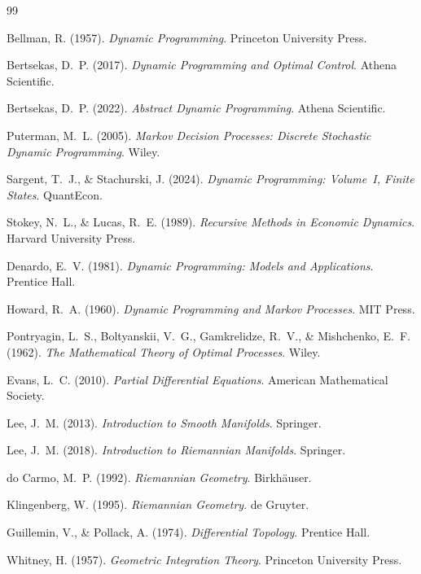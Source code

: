 \documentclass[12pt, a4paper, openany]{book}
\theoremstyle{plain}
\theoremstyle{definition}
\theoremstyle{remark}
\begin{document}
\begin{thebibliography}{99}

Bellman, R. (1957).
\textit{Dynamic Programming}.
Princeton University Press.

Bertsekas, D.~P. (2017).
\textit{Dynamic Programming and Optimal Control}.
Athena Scientific.

Bertsekas, D.~P. (2022).
\textit{Abstract Dynamic Programming}.
Athena Scientific.

Puterman, M.~L. (2005).
\textit{Markov Decision Processes: Discrete Stochastic Dynamic Programming}.
Wiley.

Sargent, T.~J., \& Stachurski, J. (2024).
\textit{Dynamic Programming: Volume~I, Finite States}.
QuantEcon.

Stokey, N.~L., \& Lucas, R.~E. (1989).
\textit{Recursive Methods in Economic Dynamics}.
Harvard University Press.

Denardo, E.~V. (1981).
\textit{Dynamic Programming: Models and Applications}.
Prentice Hall.

Howard, R.~A. (1960).
\textit{Dynamic Programming and Markov Processes}.
MIT Press.

Pontryagin, L.~S., Boltyanskii, V.~G., Gamkrelidze, R.~V., \& Mishchenko, E.~F. (1962).
\textit{The Mathematical Theory of Optimal Processes}.
Wiley.

Evans, L.~C. (2010).
\textit{Partial Differential Equations}.
American Mathematical Society.

Lee, J.~M. (2013).
\textit{Introduction to Smooth Manifolds}.
Springer.

Lee, J.~M. (2018).
\textit{Introduction to Riemannian Manifolds}.
Springer.

do Carmo, M.~P. (1992).
\textit{Riemannian Geometry}.
Birkhäuser.

Klingenberg, W. (1995).
\textit{Riemannian Geometry}.
de Gruyter.

Guillemin, V., \& Pollack, A. (1974).
\textit{Differential Topology}.
Prentice Hall.

Whitney, H. (1957).
\textit{Geometric Integration Theory}.
Princeton University Press.


\end{thebibliography}
\end{document}
